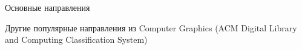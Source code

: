 \documentclass{beamer}
\begin{document}
\begin{frame}{Основные направления}
{			%



			Другие популярные направления из Computer Graphics (ACM Digital Library and Computing Classification System)
			\vspace{0.5em}

}
\end{frame}
\end{document}
